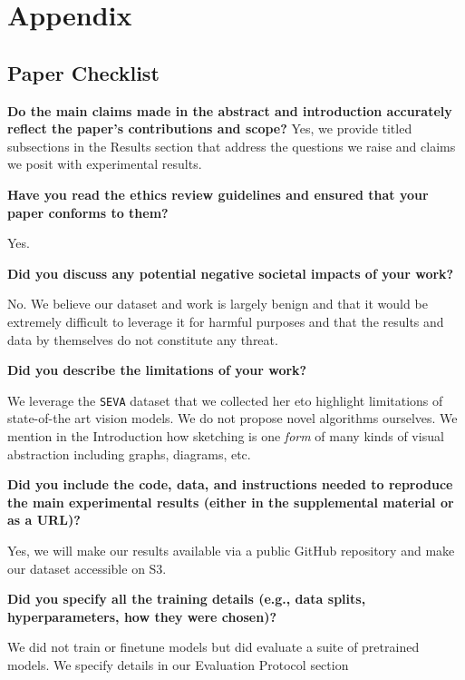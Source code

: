 \documentclass{article}
\begin{document}



\newpage
\appendix


\section{Appendix}

\subsection{Paper Checklist}

\textbf{Do the main claims made in the abstract and introduction accurately reflect the paper's contributions and scope?}
Yes, we provide titled subsections in the Results section that address the questions we raise and claims we posit with experimental results.

\textbf{Have you read the ethics review guidelines and ensured that your paper conforms to them?}

Yes.

\textbf{ Did you discuss any potential negative societal impacts of your work?}

No. We believe our dataset and work is largely benign and that it would be extremely difficult to leverage it for harmful purposes and that the results and data by themselves do not constitute any threat.

\textbf{ Did you describe the limitations of your work?}

We leverage the \texttt{SEVA} dataset that we collected her eto highlight limitations of state-of-the art vision models.
We do not propose novel algorithms ourselves.
We mention in the Introduction how sketching is one \textit{form} of many kinds of visual abstraction including graphs, diagrams, etc.

\textbf{
 Did you include the code, data, and instructions needed to reproduce the main experimental results (either in the supplemental material or as a URL)?}

 Yes, we will make our results available via a public GitHub repository and make our dataset accessible on S3.


\textbf{ Did you specify all the training details (e.g., data splits, hyperparameters, how they were chosen)?}

We did not train or finetune models but did evaluate a suite of pretrained models. We specify details in our Evaluation Protocol section
\end{document}
